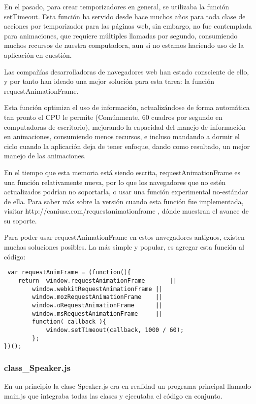 En el pasado, para crear temporizadores en general, se utilizaba la función setTimeout. Esta función ha servido desde hace muchos años para toda clase de acciones por temporizador para las páginas web, sin embargo, no fue contemplada para animaciones, que requiere múltiples llamadas por segundo, consumiendo muchos recursos de nuestra computadora, aun si no estamos haciendo uso de la aplicación en cuestión.

Las compañías desarrolladoras de navegadores web han estado consciente de ello, y por tanto han ideado una mejor solución para esta tarea: la función requestAnimationFrame.

Esta función optimiza el uso de información, actualizándose de forma automática tan pronto el CPU le permite (Comúnmente, 60 cuadros por segundo en computadoras de escritorio), mejorando la capacidad del manejo de información en animaciones, consumiendo menos recursos, e incluso mandando a dormir el ciclo cuando la aplicación deja de tener enfoque, dando como resultado, un mejor manejo de las animaciones.

En el tiempo que esta memoria está siendo escrita, requestAnimationFrame es una función relativamente nueva, por lo que los navegadores que no estén actualizados podrían no soportarla, o usar una función experimental no-estándar de ella. Para saber más sobre la versión cuando esta función fue implementada, visitar http://caniuse.com/requestanimationframe , dónde muestran el avance de su soporte.

Para poder usar requestAnimationFrame en estos navegadores antiguos, existen muchas soluciones posibles. La más simple y popular, es agregar esta función al código:

\begin{verbatim}
 var requestAnimFrame = (function(){
    return  window.requestAnimationFrame       ||
        window.webkitRequestAnimationFrame ||
        window.mozRequestAnimationFrame    ||
        window.oRequestAnimationFrame      ||
        window.msRequestAnimationFrame     ||
        function( callback ){
            window.setTimeout(callback, 1000 / 60);
        };
})();
\end{verbatim}

\subsubsection{class\_Speaker.js}
\label{sec:speaker_ivan}
En un principio la clase Speaker.js era en realidad un programa principal llamado main.js que integraba todas las clases y ejecutaba el código en conjunto.

